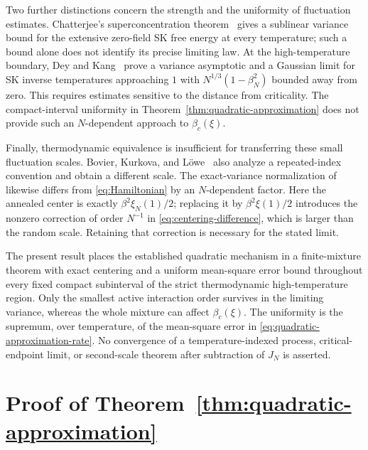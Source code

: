 \documentclass[letterpaper,11pt,reqno]{amsart}
\begin{document}
Two further distinctions concern the strength and the uniformity of
fluctuation estimates. Chatterjee's
superconcentration theorem~\cite{Chatterjee2009} gives a
sublinear variance bound for the extensive zero-field SK free
energy at every temperature; such a bound alone does not identify
its precise limiting law. At the high-temperature boundary,
Dey and Kang~\cite{DeyKang2026} prove a variance asymptotic and a
Gaussian limit for SK inverse temperatures approaching $1$ with
$N^{1/3}(1-\beta_N^2)$ bounded away from zero. This requires
estimates sensitive to the distance from criticality. The
compact-interval uniformity in
Theorem~\ref{thm:quadratic-approximation} does not provide such an
$N$-dependent approach to $\beta_c(\xi)$.

Finally, thermodynamic equivalence is insufficient for transferring
these small fluctuation scales. Bovier, Kurkova, and
L\"owe~\cite{BovierKurkovaLowe2002} also analyze a repeated-index
convention and obtain a different scale. The exact-variance
normalization of~\cite{BovierSchertzer2024} likewise differs from
\eqref{eq:Hamiltonian} by an $N$-dependent factor. Here the
annealed center is exactly $\beta^2\xi_N(1)/2$; replacing it by
$\beta^2\xi(1)/2$ introduces the nonzero correction of order
$N^{-1}$ in \eqref{eq:centering-difference}, which is larger than
the random scale. Retaining that correction is necessary for the
stated limit.

The present result places the established quadratic mechanism in a
finite-mixture theorem with exact centering and a uniform
mean-square error bound throughout every fixed compact subinterval
of the strict thermodynamic high-temperature region. Only the
smallest active interaction order survives in the limiting
variance, whereas the whole mixture can affect $\beta_c(\xi)$.
The uniformity is the supremum, over temperature, of the
mean-square error in
\eqref{eq:quadratic-approximation-rate}. No convergence of a
temperature-indexed process, critical-endpoint limit, or
second-scale theorem after subtraction of $J_N$ is asserted.

\section{Proof of Theorem~\ref{thm:quadratic-approximation}}
\label{sec:quadratic-approximation}
\end{document}
